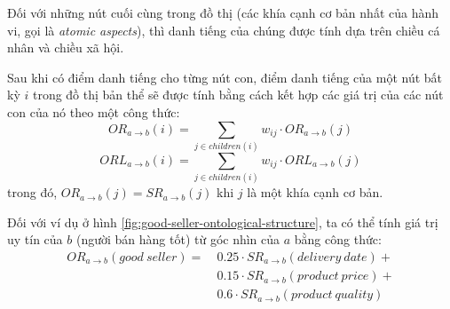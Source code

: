 Đối với những nút cuối cùng trong đồ thị (các khía cạnh cơ bản nhất của hành vi, gọi là \textit{atomic aspects}),
thì danh tiếng của chúng được tính dựa trên chiều cá nhân và chiều xã hội.

Sau khi có điểm danh tiếng cho từng nút con, điểm danh tiếng của một nút bất kỳ $i$ trong đồ thị bản thể sẽ được tính bằng cách kết hợp
các giá trị của các nút con của nó theo một công thức:
\[OR_{a \rightarrow b}(i) = \sum_{j \in children(i)} w_{ij} \cdot OR_{a \rightarrow b}(j)\]
\[ORL_{a \rightarrow b}(i) = \sum_{j \in children(i)} w_{ij} \cdot ORL_{a \rightarrow b}(j)\]
trong đó, $OR_{a \rightarrow b}(j) = SR_{a \rightarrow b}(j)$ khi $j$ là một khía cạnh cơ bản.

Đối với ví dụ ở hình \ref{fig:good-seller-ontological-structure}, ta có thể tính giá trị uy tín của $b$ (người bán hàng tốt)
từ góc nhìn của $a$ bằng công thức:
\begin{align*}
  OR_{a \rightarrow b}(good\ seller) =\  & 0.25 \cdot SR_{a \rightarrow b}(delivery\ date) + \\
                                        & 0.15 \cdot SR_{a \rightarrow b}(product\ price) + \\
                                        & 0.6 \cdot SR_{a \rightarrow b}(product\ quality)
\end{align*}